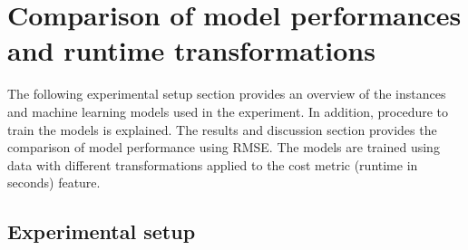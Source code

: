 




\section{Comparison of model performances and runtime transformations}
\label{section:trainingexperiment}
The following experimental setup section provides an overview of the instances and machine learning models used in the experiment. In addition, procedure to train the models is explained. The results and discussion section provides the comparison of model performance using RMSE. The models are trained using data with different transformations applied to the cost metric (runtime in seconds) feature.

\subsection{Experimental setup}


